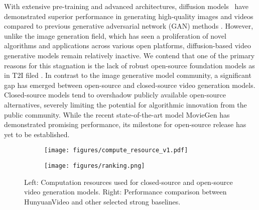 \documentclass{article}
\newcommand{\nameofmethod}{HunyuanVideo}
\newif \ifhq
\begin{document}
With extensive pre-training and advanced architectures, diffusion models~\cite{li2024hunyuandit,peebles2023scalable,esser2024scaling,rombach2022high,blattmann2023stable,girdhar2023emu,polyak2024movie,FLUX} have demonstrated superior performance in generating high-quality images and videos compared to previous generative adversarial network (GAN) methods \citep{brock2018large}.
However, unlike the image generation field, which has seen a proliferation of novel algorithms and applications across various open platforms, diffusion-based video generative models remain relatively inactive. We contend that one of the primary reasons for this stagnation is the lack of robust open-source foundation models as in T2I filed \cite{FLUX}. In contrast to the image generative model community, a significant gap has emerged between open-source and closed-source video generation models. Closed-source models tend to overshadow publicly available open-source alternatives, severely limiting the potential for algorithmic innovation from the public community. While the recent state-of-the-art model MovieGen \cite{polyak2024movie} has demonstrated promising performance, its milestone for open-source release has yet to be established.

\begin{figure}[h]
    \centering
    \begin{subfigure}[b]{0.47\textwidth}
        \centering
        \texttt{[image: figures/compute\_resource\_v1.pdf]} 
    \end{subfigure}
    \begin{subfigure}[b]{0.45\textwidth}
        \centering
        \ifhq
        \texttt{[image: hqfigures/ranking.pdf]}
        \else
        \texttt{[image: figures/ranking.png]}
        \fi
    \end{subfigure}
    \label{fig:side_by_side}
    \caption{Left: Computation resources used for closed-source and open-source video generation models. Right: Performance comparison between \nameofmethod{} and other selected strong baselines.}
\end{figure}
\end{document}
